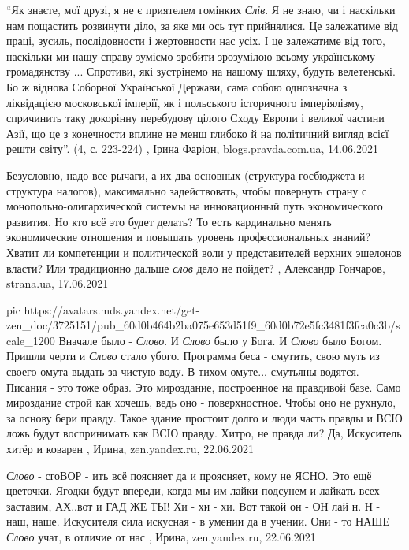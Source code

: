 \enquote{Як знаєте, мої друзі, я не є приятелем гомінких \emph{Слів}. Я не
знаю, чи і наскільки нам пощастить розвинути діло, за яке ми ось тут
прийнялися. Це залежатиме від праці, зусиль, послідовности і жертовности нас
усіх. І це залежатиме від того, наскільки ми нашу справу зуміємо зробити
зрозумілою всьому українському громадянству ...  Спротиви, які зустрінемо на
нашому шляху, будуть велетенські. Бо ж віднова Соборної Української Держави,
сама собою однозначна з ліквідацією московської імперії, як і польського
історичного імперіялізму, спричинить таку докорінну перебудову цілого Сходу
Европи і великої частини Азії, що це з конечности вплине не менш глибоко й на
політичний вигляд всієї решти світу}. (4, с.  223-224)
, 
Ірина Фаріон, blogs.pravda.com.ua, 14.06.2021

Безусловно, надо все рычаги, а их два основных (структура госбюджета и
структура налогов), максимально задействовать, чтобы повернуть страну с
монопольно-олигархической системы на инновационный путь экономического
развития.  Но кто всё это будет делать? То есть кардинально менять
экономические отношения и повышать уровень профессиональных знаний? Хватит ли
компетенции и политической воли у представителей верхних эшелонов власти?  Или
традиционно дальше \emph{слов} дело не пойдет?
, 
Александр Гончаров, strana.ua, 17.06.2021

\ifcmt
  pic https://avatars.mds.yandex.net/get-zen_doc/3725151/pub_60d0b464b2ba075e653d51f9_60d0b72e5fc3481f3fca0c3b/scale_1200
\fi
Вначале было - \emph{Слово}. И \emph{Слово} было у Бога. И \emph{Слово} было Богом.  Пришли черти и
\emph{Слово} стало убого. Программа беса - смутить, свою муть из своего омута выдать
за чистую воду. В тихом омуте... смутьяны водятся.  Писания - это тоже образ.
Это мироздание, построенное на правдивой базе. Само мироздание строй как
хочешь, ведь оно - поверхностное. Чтобы оно не рухнуло, за основу бери правду.
Такое здание простоит долго и люди часть правды и ВСЮ ложь будут воспринимать
как ВСЮ правду. Хитро, не правда ли? Да, Искуситель хитёр и коварен
, 
Ирина, zen.yandex.ru, 22.06.2021

\emph{Слово} - сгоВОР - ить всё поясняет да и проясняет, кому не ЯСНО.  Это ещё
цветочки. Ягодки будут впереди, когда мы им лайки подсунем и лайкать всех
заставим, АХ..вот и ГАД ЖЕ ТЫ! Хи - хи - хи. Вот такой он - ОН лай н. Н - наш,
наше. Искусителя сила искусная - в умении да в учении. Они - то НАШЕ \emph{Слово}
учат, в отличие от нас
, 
Ирина, zen.yandex.ru, 22.06.2021

